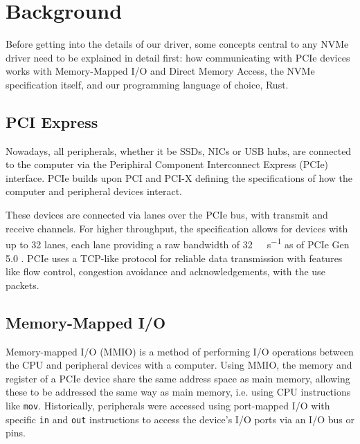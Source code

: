 \chapter{Background}\label{chapter:basics}

Before getting into the details of our driver, some concepts central to any NVMe driver need to be explained in detail first: how communicating with PCIe devices works with Memory-Mapped I/O and Direct Memory Access, the NVMe specification itself, and our programming language of choice, Rust.

\section{PCI Express}
Nowadays, all peripherals, whether it be SSDs, NICs or USB hubs, are connected to the computer via the Periphiral Component Interconnect Express (PCIe) interface. PCIe builds upon PCI and PCI-X defining the specifications of how the computer and peripheral devices interact.

These devices are connected via lanes over the PCIe bus, with transmit and receive channels. For higher throughput, the specification allows for devices with up to 32 lanes, each lane providing a raw bandwidth of \qty[per-mode=symbol]{32}{\giga\bit\per\second} as of PCIe Gen 5.0 \cite{pcie}. PCIe uses a TCP-like protocol for reliable data transmission with features like flow control, congestion avoidance and acknowledgements, with the use packets.





\section{Memory-Mapped I/O}
Memory-mapped I/O (MMIO) is a method of performing I/O operations between the CPU and peripheral devices with a computer. Using MMIO, the memory and register of a PCIe device share the same address space as main memory, allowing these to be addressed the same way as main memory, i.e. using CPU instructions like \texttt{mov}. Historically, peripherals were accessed using port-mapped I/O with specific \texttt{in} and \texttt{out} instructions to access the device's I/O ports via an I/O bus or pins.

